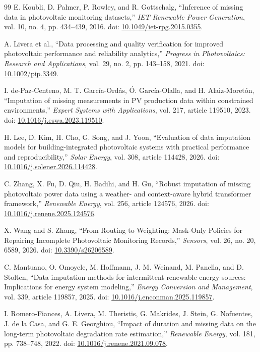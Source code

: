 \documentclass[preprint,12pt]{elsarticle}
\begin{document}
\begin{thebibliography}{99}
 E. Koubli, D. Palmer, P. Rowley, and R. Gottschalg, ``Inference of missing data in photovoltaic monitoring datasets,'' \emph{IET Renewable Power Generation}, vol. 10, no. 4, pp. 434--439, 2016. doi: \href{https://doi.org/10.1049/iet-rpg.2015.0355}{10.1049/iet-rpg.2015.0355}.

 A. Livera et al., ``Data processing and quality verification for improved photovoltaic performance and reliability analytics,'' \emph{Progress in Photovoltaics: Research and Applications}, vol. 29, no. 2, pp. 143--158, 2021. doi: \href{https://doi.org/10.1002/pip.3349}{10.1002/pip.3349}.

 I. de-Paz-Centeno, M. T. Garc\'{i}a-Ord\'{a}s, \'{O}. Garc\'{i}a-Olalla, and H. Alaiz-Moret\'{o}n, ``Imputation of missing measurements in PV production data within constrained environments,'' \emph{Expert Systems with Applications}, vol. 217, article 119510, 2023. doi: \href{https://doi.org/10.1016/j.eswa.2023.119510}{10.1016/j.eswa.2023.119510}.

 H. Lee, D. Kim, H. Cho, G. Song, and J. Yoon, ``Evaluation of data imputation models for building-integrated photovoltaic systems with practical performance and reproducibility,'' \emph{Solar Energy}, vol. 308, article 114428, 2026. doi: \href{https://doi.org/10.1016/j.solener.2026.114428}{10.1016/j.solener.2026.114428}.

 C. Zhang, X. Fu, D. Qiu, H. Badihi, and H. Gu, ``Robust imputation of missing photovoltaic power data using a weather- and context-aware hybrid transformer framework,'' \emph{Renewable Energy}, vol. 256, article 124576, 2026. doi: \href{https://doi.org/10.1016/j.renene.2025.124576}{10.1016/j.renene.2025.124576}.

 X. Wang and S. Zhang, ``From Routing to Weighting: Mask-Only Policies for Repairing Incomplete Photovoltaic Monitoring Records,'' \emph{Sensors}, vol. 26, no. 20, 6589, 2026. doi: \href{https://doi.org/10.3390/s26206589}{10.3390/s26206589}.

 C. Mantuano, O. Omoyele, M. Hoffmann, J. M. Weinand, M. Panella, and D. Stolten, ``Data imputation methods for intermittent renewable energy sources: Implications for energy system modeling,'' \emph{Energy Conversion and Management}, vol. 339, article 119857, 2025. doi: \href{https://doi.org/10.1016/j.enconman.2025.119857}{10.1016/j.enconman.2025.119857}.

 I. Romero-Fiances, A. Livera, M. Theristis, G. Makrides, J. Stein, G. Nofuentes, J. de la Casa, and G. E. Georghiou, ``Impact of duration and missing data on the long-term photovoltaic degradation rate estimation,'' \emph{Renewable Energy}, vol. 181, pp. 738--748, 2022. doi: \href{https://doi.org/10.1016/j.renene.2021.09.078}{10.1016/j.renene.2021.09.078}.


\end{thebibliography}
\end{document}
